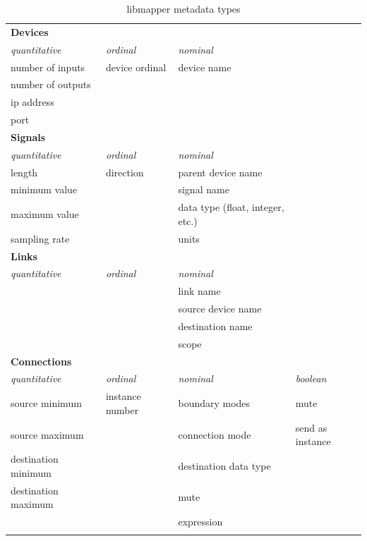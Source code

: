 \begin{longtable}{l l p{4cm} l}
\caption[libmapper metadata types]{libmapper metadata types} \label{tab:metadata_types} \\

	\hline\hline
	\textbf{Devices} & & \\
	\emph{quantitative} & \emph{ordinal} & \emph{nominal}\\
	\hline
	number of inputs & device ordinal & device name\\
		number of outputs \\
	ip address \\
	port \\ [0.7cm]

	\hline\hline
	\textbf{Signals} & & \\
	\emph{quantitative} & \emph{ordinal} & \emph{nominal}\\
	\hline
	length & direction & parent device name\\
	minimum value & & signal name \\
	maximum value & & data type (float, integer, etc.)\\
	sampling rate & & units \\ [0.7cm]

	\hline\hline
	\textbf{Links} & & \\
	\emph{quantitative} & \emph{ordinal} & \emph{nominal}\\
	\hline
	& & link name \\
	& & source device name \\
	& & destination name \\
	& & scope \\ [0.7cm]

	\hline\hline
	\textbf{Connections} & & \\
	\emph{quantitative} & \emph{ordinal} & \emph{nominal} & \emph{boolean}\\
	\hline
	source minimum & instance number & boundary modes & mute\\
	source maximum & & connection mode & send as instance\\
	destination minimum & & destination data type \\
	destination maximum & & mute \\
	& & expression \\
	& & \\
\end{longtable}


